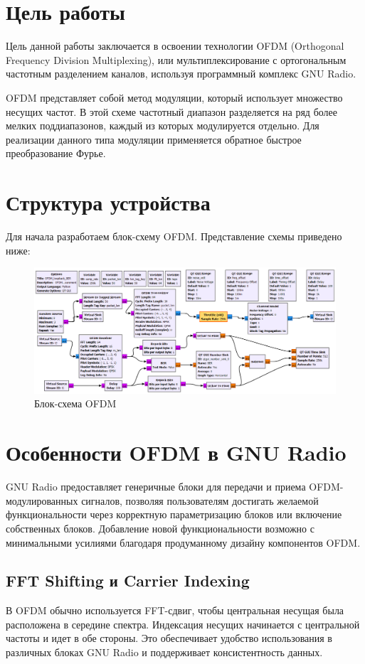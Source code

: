 \section{Цель работы}
Цель данной работы заключается в освоении технологии OFDM (Orthogonal Frequency Division Multiplexing), или мультиплексирование с ортогональным частотным разделением каналов, используя программный комплекс GNU Radio.

OFDM представляет собой метод модуляции, который использует множество несущих частот. В этой схеме частотный диапазон разделяется на ряд более мелких поддиапазонов, каждый из которых модулируется отдельно. Для реализации данного типа модуляции применяется обратное быстрое преобразование Фурье.

\section{Структура устройства}
Для начала разработаем блок-схему OFDM. Представление схемы приведено ниже:
\begin{figure}[H]
    \centering
    \includegraphics[width=1.0\linewidth]{Image1.png}
    \caption{Блок-схема OFDM}
    \label{fig:OFDM-schema}
\end{figure}

\section{Особенности OFDM в GNU Radio}
GNU Radio предоставляет генеричные блоки для передачи и приема OFDM-модулированных сигналов, позволяя пользователям достигать желаемой функциональности через корректную параметризацию блоков или включение собственных блоков. Добавление новой функциональности возможно с минимальными усилиями благодаря продуманному дизайну компонентов OFDM.

\subsection{FFT Shifting и Carrier Indexing}
В OFDM обычно используется FFT-сдвиг, чтобы центральная несущая была расположена в середине спектра. Индексация несущих начинается с центральной частоты и идет в обе стороны. Это обеспечивает удобство использования в различных блоках GNU Radio и поддерживает консистентность данных.

